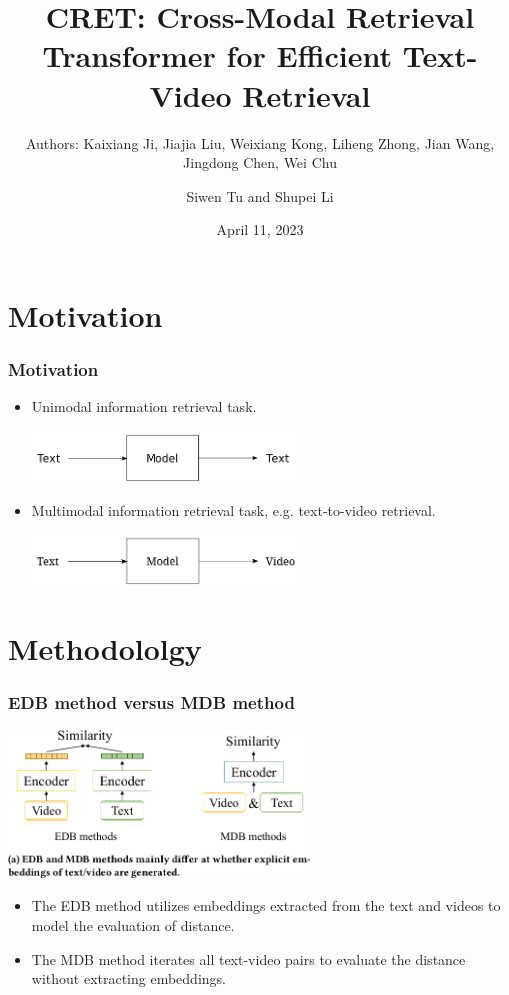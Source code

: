 \documentclass[notes, 10pt, aspectratio=169]{beamer}
\title{CRET: Cross-Modal Retrieval Transformer for Efficient Text-Video Retrieval}
\subtitle{Authors: Kaixiang Ji, Jiajia Liu, Weixiang Kong, Liheng Zhong, Jian Wang, Jingdong Chen, Wei Chu}
\author{Siwen Tu and Shupei Li}
\institute[LIACS]{Leiden Institute of Advanced Computer Science}
\date{April 11, 2023}
\begin{document}
\begin{frame}[plain]
	\titlepage
\end{frame}

\begin{frame}
	\tableofcontents
\end{frame}

\section{Motivation}
\begin{frame}
    \frametitle{Motivation}
    \begin{itemize}
        \item Unimodal information retrieval task.
            \vspace{0.1cm}
            \begin{center}
                \includegraphics[width=7cm]{single-modality.png}
            \end{center}
            \vspace{0.1cm}
        \item Multimodal information retrieval task, e.g. text-to-video retrieval.
            \vspace{0.1cm}
            \begin{center}
                \includegraphics[width=7cm]{multimodality.png}
            \end{center}
    \end{itemize}
\end{frame}

\section{Methodololgy}
\begin{frame}
    \frametitle{EDB method versus MDB method}
    \begin{center}
        \includegraphics[width=8cm]{edb-mdb.png}
    \end{center}
    \begin{itemize}
        \item The EDB method utilizes embeddings extracted from the text and videos to model the evaluation of distance.
        \item The MDB method iterates all text-video pairs to evaluate the distance without extracting embeddings.
    \end{itemize}
\end{frame}
\end{document}
